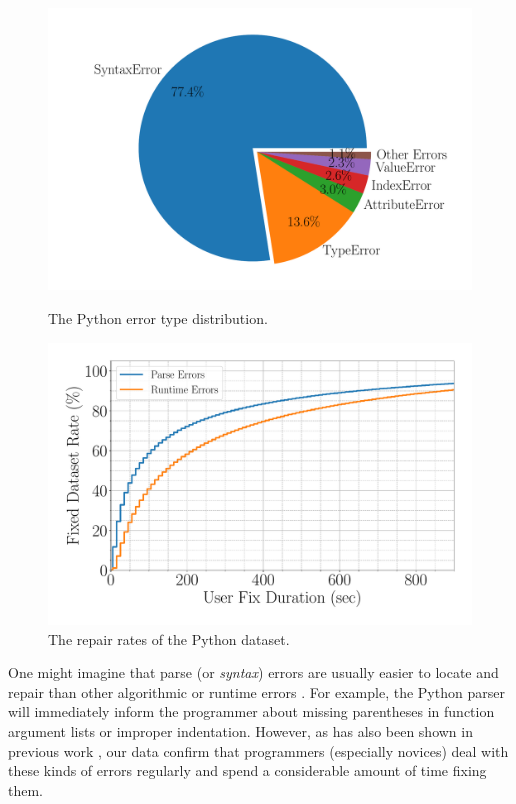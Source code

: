\begin{figure}[t]
  \centering
  \begin{minipage}[t]{0.48\linewidth}
    \centering
    \includegraphics[width=\linewidth]{error-pie.pdf}
    \caption{The Python error type distribution.}
    \label{fig:error-statistics}
  \end{minipage}
  \begin{minipage}[t]{0.51\linewidth}
      \centering
      \includegraphics[width=\linewidth]{fixed-rate.pdf}
      \caption{The repair rates of the Python dataset.}
      \label{fig:repair-rate}
  \end{minipage}
\end{figure}

One might imagine that parse (or \emph{syntax}) errors are
usually easier to locate and repair than other algorithmic
or runtime errors \citep{Denny_2012}.
%
For example, the Python parser will immediately inform the programmer
about missing parentheses in function argument lists or improper
indentation.
%
However, as has also been shown in previous work \citep{Ahadi_2018,
Kummerfeld2003}, our data confirm that programmers (especially novices) deal
with these kinds of errors regularly and spend a considerable amount of time
fixing them.

